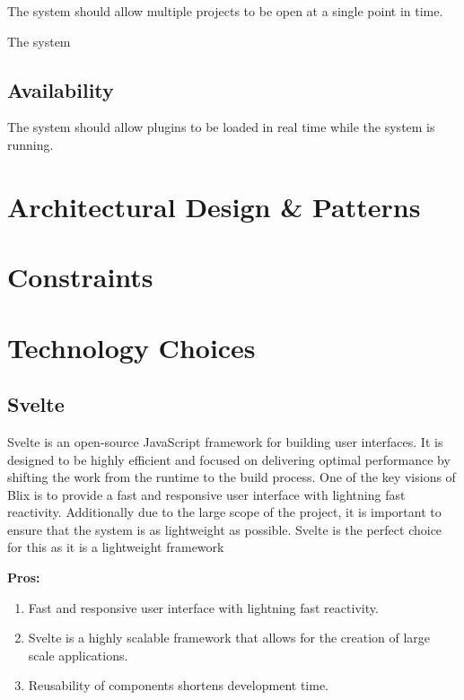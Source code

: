 \documentclass[11pt,a4paper]{article}
\begin{document}
The system should allow multiple projects to be open at a single point in time.

The system

\subsection*{Availability}

The system should allow plugins to be loaded in real time while the system is running.

\section*{Architectural Design \& Patterns}

\section*{Constraints}


\section*{Technology Choices}


\subsection*{Svelte}
Svelte is an open-source JavaScript framework for building user interfaces. It is designed to be highly efficient and focused on delivering optimal performance by shifting the work from the runtime to the build process.
One of the key visions of Blix is to provide a fast and responsive user interface with lightning fast reactivity. Additionally due to the large scope
of the project, it is important to ensure that the system is as lightweight as possible. Svelte is the perfect choice for this as it is a lightweight framework

\textbf{Pros:}
\begin{enumerate}[label*=\arabic*.]
	\item[\textbullet] Fast and responsive user interface with lightning fast reactivity. 
	\item[\textbullet] Svelte is a highly scalable framework that allows for the creation of large scale applications.
	\item[\textbullet] Reusability of components shortens development time.
\end{enumerate}
\end{document}
